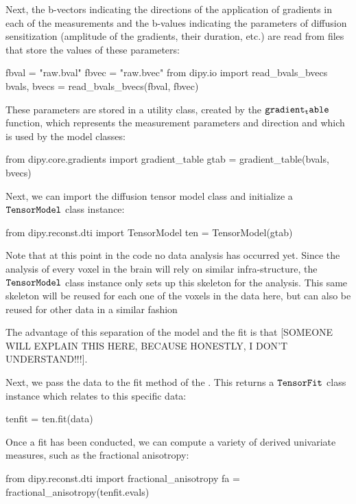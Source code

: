 \documentclass{bioinfo}
\begin{document}
Next, the b-vectors indicating the directions of the application of gradients in each of the measurements and the b-values indicating the parameters of diffusion sensitization (amplitude of the gradients, their duration, etc.) are read from files that store the values of these parameters:

\begin{python}
fbval = "raw.bval"
fbvec = "raw.bvec"
from dipy.io import read_bvals_bvecs
bvals, bvecs = read_bvals_bvecs(fbval, fbvec)
\end{python}

These parameters are stored in a utility class, created by the $\tt{gradient_table}$ function, which represents the measurement parameters and direction and which is used by the model classes:

\begin{python}
from dipy.core.gradients import gradient_table
gtab = gradient_table(bvals, bvecs)
\end{python}

Next, we can import the diffusion tensor model class and initialize a $\tt{TensorModel}$ class instance: 
\begin{python}
from dipy.reconst.dti import TensorModel
ten = TensorModel(gtab)
\end{python}

Note that at this point in the code no data analysis has occurred yet. Since the analysis of every voxel in the brain will rely on similar infra-structure, the $\tt{TensorModel}$ class instance only sets up this skeleton for the analysis. This same skeleton will be reused for each one of the voxels in the data here, but can also be reused for other data in a similar fashion 

The advantage of this separation of the model and the fit is that [SOMEONE WILL EXPLAIN THIS HERE, BECAUSE HONESTLY, I DON'T UNDERSTAND!!!]. 

Next, we pass the data to the fit method of the . This returns a $\tt{TensorFit}$ class instance which relates to this specific data: 

\begin{python}
tenfit = ten.fit(data)
\end{python}

Once a fit has been conducted, we can compute a variety of derived univariate measures, such as the fractional anisotropy: 

\begin{python}
from dipy.reconst.dti import fractional_anisotropy
fa = fractional_anisotropy(tenfit.evals)
\end{python}
\end{document}
